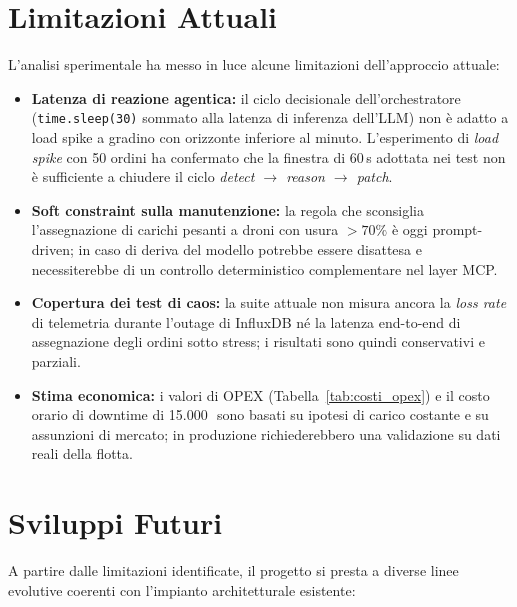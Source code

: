 \section{Limitazioni Attuali}
\label{sec:limitazioni}

L'analisi sperimentale ha messo in luce alcune limitazioni dell'approccio attuale:

\begin{itemize}
    \item \textbf{Latenza di reazione agentica:} il ciclo decisionale dell'orchestratore (\texttt{time.sleep(30)} sommato alla latenza di inferenza dell'LLM) non è adatto a load spike a gradino con orizzonte inferiore al minuto. L'esperimento di \emph{load spike} con 50 ordini ha confermato che la finestra di 60\,s adottata nei test non è sufficiente a chiudere il ciclo \emph{detect $\rightarrow$ reason $\rightarrow$ patch}.
    \item \textbf{Soft constraint sulla manutenzione:} la regola che sconsiglia l'assegnazione di carichi pesanti a droni con usura $>70\%$ è oggi prompt-driven; in caso di deriva del modello potrebbe essere disattesa e necessiterebbe di un controllo deterministico complementare nel layer MCP.
    \item \textbf{Copertura dei test di caos:} la suite attuale non misura ancora la \textit{loss rate} di telemetria durante l'outage di InfluxDB né la latenza end-to-end di assegnazione degli ordini sotto stress; i risultati sono quindi conservativi e parziali.
    \item \textbf{Stima economica:} i valori di OPEX (Tabella~\ref{tab:costi_opex}) e il costo orario di downtime di 15.000\,\texteuro\ sono basati su ipotesi di carico costante e su assunzioni di mercato; in produzione richiederebbero una validazione su dati reali della flotta.
\end{itemize}

\section{Sviluppi Futuri}
\label{sec:sviluppi_futuri}

A partire dalle limitazioni identificate, il progetto si presta a diverse linee evolutive coerenti con l'impianto architetturale esistente:


